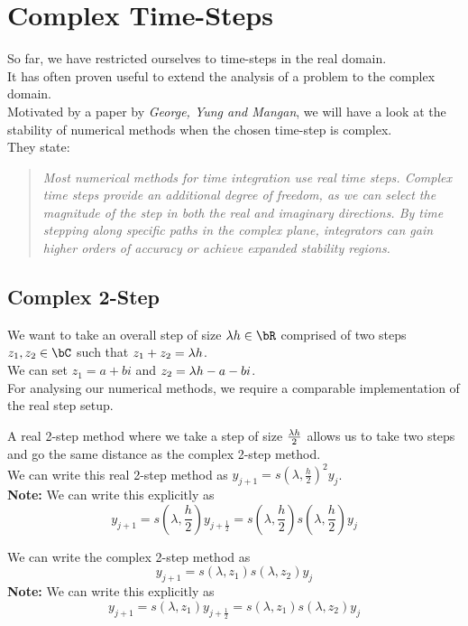 \section{Complex Time-Steps}
So far, we have restricted ourselves to time-steps in the real domain.\\
It has often proven useful to extend the analysis of a problem to the complex domain.\\
Motivated by a paper by \textit{George, Yung and Mangan}\cite{walking_into_the_complex_domain}, we will have a look at the stability of numerical methods when the chosen time-step is complex.\\
They state: \begin{quote} \textit {Most numerical methods for time integration use real time steps. Complex time steps provide an additional degree of freedom, as we can select the magnitude of the step in both the real and imaginary directions. By time stepping along specific paths in the complex plane, integrators can gain higher orders of accuracy or achieve expanded stability regions.}\end{quote}

\subsection{Complex 2-Step}
\begin{multicols}{2}
\par We want to take an overall step of size $\lh \in \bR$ comprised of two steps $z_1, z_2 \in \bC$ such that $z_1 + z_2 = \lambda h$.\\
We can set $z_1 = a + bi$ and $z_2 = \lambda h - a - bi$.\\
For analysing our numerical methods, we require a comparable implementation of the real step setup.\\

\par A real 2-step method where we take a step of size $\frac{\lambda h}{2}$ allows us to take two steps and go the same distance as the complex 2-step method.\\
We can write this real 2-step method as $y_{j+1} = {s(\lambda, \frac{h}{2})}^{2} y_j$.\\
\textbf{Note:} We can write this explicitly as 
\[y_{j+1} = s(\lambda, \frac{h}{2}) y_{j+\frac{1}{2}} = s(\lambda, \frac{h}{2}) s(\lambda, \frac{h}{2}) y_j\]

\par We can write the complex 2-step method as 
\[y_{j+1} = s(\lambda, z_1) s(\lambda, z_2) y_j\]
\textbf{Note:} We can write this explicitly as 
\[y_{j+1} = s(\lambda, z_1) y_{j+\frac{1}{2}} = s(\lambda, z_1) s(\lambda, z_2) y_j\]

\columnbreak{}
\end{multicols}


